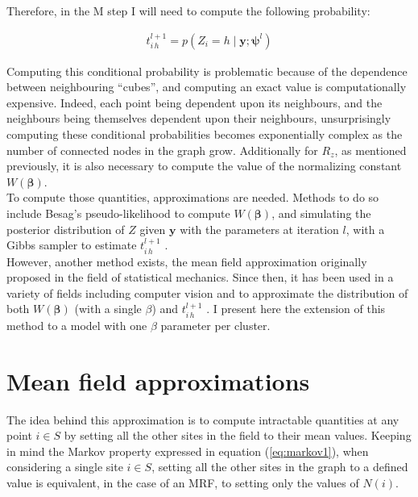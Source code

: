 Therefore, in the M step I will need to compute the following probability:

\begin{align*}
t_{i\,h}^{l+1} = p(Z_i = h \mid \boldsymbol{y};\boldsymbol{\psi}^{l})
\end{align*}

Computing this conditional probability is problematic because of the dependence between neighbouring ``cubes'', and computing an exact value is computationally expensive. Indeed, each point being dependent upon its neighbours, and the neighbours being themselves dependent upon their neighbours, unsurprisingly computing these conditional probabilities becomes exponentially complex as the number of connected nodes in the graph grow. Additionally for $R_z$, as mentioned previously, it is also necessary to compute the value of the normalizing constant $W(\boldsymbol{\beta})$.\\

To compute those quantities, approximations are needed. Methods to do so include Besag's pseudo-likelihood \citep{Besag75} to compute $W(\boldsymbol{\beta})$, and simulating the posterior distribution of $Z$ given $\boldsymbol{y}$ with the parameters at iteration $l$, with a Gibbs sampler to estimate $t_{i\,h}^{l+1}$ \citep{Chalmond89}.\\

However, another method exists, the mean field approximation originally proposed in the field of statistical mechanics. Since then, it has been used in a variety of fields including computer vision \citep{Yuille90} and to approximate the distribution of both $W(\boldsymbol{\beta})$ (with a single $\beta$) and $t_{i\,h}^{l+1}$ \citep{Zhang92}. I present here the extension of this method to a model with one $\beta$ parameter per cluster.

\section{Mean field approximations}

The idea behind this approximation is to compute intractable quantities at any point $i \in S$ by setting all the other sites in the field to their mean values. Keeping in mind the Markov property expressed in equation (\ref{eq:markov1}), when considering a single site $i \in S$, setting all the other sites in the graph to a defined value is equivalent, in the case of an MRF, to setting only the values of $N(i)$.\\

